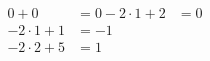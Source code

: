 \documentclass[preview]{standalone}
\begin{document}
\begin{align*}
0 + 0 & = 0- 2\cdot1 + 2 & = 0 \\ - 2\cdot1 + 1 & = -1 \\ - 2\cdot2 + 5 & = 1
\end{align*}
\end{document}
